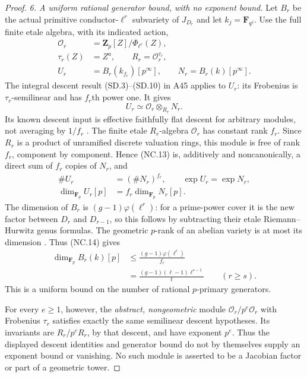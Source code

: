 \begin{proof}
\emph{6. A uniform rational generator bound, with no exponent bound.}
Let $B_r$ be the actual primitive conductor-$\ell^r$
subvariety of $J_{D_r}$ and let $k_j=\mathbf F_{q^j}$.
Use the full finite etale algebra, with its indicated action,
\[
\begin{aligned}
 \mathcal O_r&=\mathbf Z_p[Z]/\Phi_{\ell^r}(Z),\\
 \tau_r(Z)&=Z^a,\qquad R_r=\mathcal O_r^{\tau_r},\\
 U_r&=B_r(k_{f_r})[p^\infty],\qquad
 N_r=B_r(k)[p^\infty].
\end{aligned}
       \tag{NC.12}
\]
The integral descent result (SD.3)--(SD.10) in A45 applies
to $U_r$: its Frobenius is $\tau_r$-semilinear and has
$f_r$th power one. It gives
\[
                 U_r\simeq\mathcal O_r\otimes_{R_r}N_r.
       \tag{NC.13}
\]
Its known descent input is effective faithfully flat descent
for arbitrary modules, not averaging by $1/f_r$
\cite[Proposition~35.3.9, Tag~\texttt{023N}]{Stacks023N}.
The finite etale $R_r$-algebra $\mathcal O_r$ has constant
rank $f_r$. Since $R_r$ is a product of unramified discrete
valuation rings, this module is free of rank $f_r$, component
by component. Hence (NC.13) is, additively and noncanonically,
a direct sum of $f_r$ copies of $N_r$, and
\[
\begin{aligned}
 \#U_r&=(\#N_r)^{f_r},\qquad \exp U_r=\exp N_r,\\
 \dim_{\mathbf F_p}U_r[p]&=f_r\dim_{\mathbf F_p}N_r[p].
\end{aligned}
       \tag{NC.14}
\]
The dimension of $B_r$ is $(g-1)\varphi(\ell^r)$: for a
prime-power cover it is the new factor between $D_r$ and
$D_{r-1}$, so this follows by subtracting their etale
Riemann--Hurwitz genus formulas. The geometric $p$-rank
of an abelian variety is at most its dimension
\cite[Remark~8.5, the bound $r\le g$]{MilneAV}.
Thus (NC.14) gives
\[
\begin{aligned}
 \dim_{\mathbf F_p}B_r(k)[p]
 &\le \frac{(g-1)\varphi(\ell^r)}{f_r}\\
 &=\frac{(g-1)(\ell-1)\ell^{s-1}}{t}
 \qquad(r\ge s).
\end{aligned}
       \tag{NC.15}
\]
This is a uniform bound on the number of rational
$p$-primary generators.

For every $e\ge1$, however, the \emph{abstract, nongeometric}
module $\mathcal O_r/p^e\mathcal O_r$ with Frobenius
$\tau_r$ satisfies exactly the same semilinear descent
hypotheses. Its invariants are $R_r/p^eR_r$, by that descent,
and have exponent $p^e$. Thus the displayed descent identities
and generator bound do not by themselves supply an exponent
bound or vanishing. No such module is asserted to be a
Jacobian factor or part of a geometric tower.


\end{proof}
